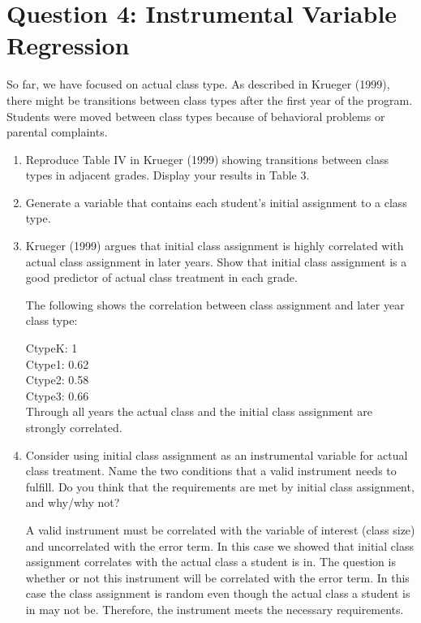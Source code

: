 \documentclass{article}
\begin{document}
\section{Question 4:  Instrumental Variable Regression}

So far, we have focused on actual class type. As described in Krueger (1999), there might be transitions between class types after the first year of the program. Students were moved between class types because of behavioral problems or parental complaints.

\begin{enumerate}[label=\alph*]

\item Reproduce Table IV in Krueger (1999) showing transitions between class types in adjacent grades. Display your results in Table 3.



\item Generate a variable that contains each student’s initial assignment to a class type.

\item Krueger (1999) argues that initial class assignment is highly correlated with actual class assignment in later years. Show that initial class assignment is a good predictor of actual class treatment in each grade.

The following shows the correlation between class assignment and later year class type:

CtypeK:  1\\
Ctype1:  0.62\\
Ctype2:  0.58\\
Ctype3: 0.66\\

Through all years the actual class and the initial class assignment are strongly correlated.

\item Consider using initial class assignment as an instrumental variable for actual class treatment. Name the two conditions that a valid instrument needs to fulfill. Do you think that the requirements are met by initial class assignment, and why/why not?

A valid instrument must be correlated with the variable of interest (class size) and uncorrelated with the error term.  In this case we showed that initial class assignment correlates with the actual class a student is in.  The question is whether or not this instrument will be correlated with the error term.  In this case the class assignment is random even though the actual class a student is in may not be.  Therefore, the instrument meets the necessary requirements.


\end{enumerate}
\end{document}
